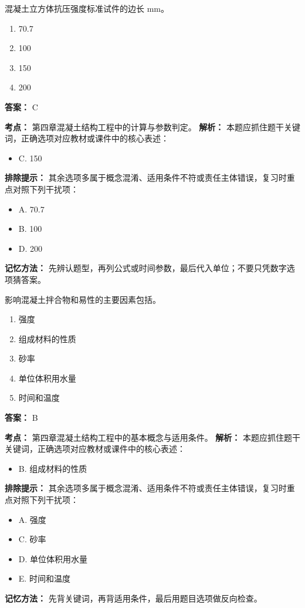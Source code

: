 \documentclass[UTF8,fontset=fandol,11pt]{ctexart}
\begin{document}
\begin{quizbox}[title={第 53 题}]
混凝土立方体抗压强度标准试件的边长 mm。\\
\begin{enumerate}[label=\Alph*.]
\item 70.7
\item 100
\item 150
\item 200
\end{enumerate}
\textbf{答案：} C
\vspace{0.25em}
\begin{answerbox}[title={考点解析}]
\textbf{考点：} 第四章混凝土结构工程中的计算与参数判定。
\textbf{解析：} 本题应抓住题干关键词，正确选项对应教材或课件中的核心表述：
\begin{itemize}
\item C. 150
\end{itemize}
\textbf{排除提示：} 其余选项多属于概念混淆、适用条件不符或责任主体错误，复习时重点对照下列干扰项：
\begin{itemize}
\item A. 70.7
\item B. 100
\item D. 200
\end{itemize}
\textbf{记忆方法：} 先辨认题型，再列公式或时间参数，最后代入单位；不要只凭数字选项猜答案。
\end{answerbox}
\end{quizbox}

\vspace{0.2em}

\begin{quizbox}[title={第 54 题}]
影响混凝土拌合物和易性的主要因素包括。\\
\begin{enumerate}[label=\Alph*.]
\item 强度
\item 组成材料的性质
\item 砂率
\item 单位体积用水量
\item 时间和温度
\end{enumerate}
\textbf{答案：} B
\vspace{0.25em}
\begin{answerbox}[title={考点解析}]
\textbf{考点：} 第四章混凝土结构工程中的基本概念与适用条件。
\textbf{解析：} 本题应抓住题干关键词，正确选项对应教材或课件中的核心表述：
\begin{itemize}
\item B. 组成材料的性质
\end{itemize}
\textbf{排除提示：} 其余选项多属于概念混淆、适用条件不符或责任主体错误，复习时重点对照下列干扰项：
\begin{itemize}
\item A. 强度
\item C. 砂率
\item D. 单位体积用水量
\item E. 时间和温度
\end{itemize}
\textbf{记忆方法：} 先背关键词，再背适用条件，最后用题目选项做反向检查。
\end{answerbox}
\end{quizbox}
\end{document}
